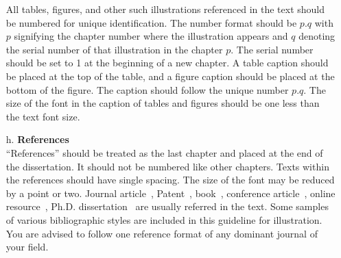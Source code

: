 \begin{itemize}
All tables, figures, and other such illustrations referenced in the text should be numbered for unique identification. The number format should be $p.q$ with $p$ signifying the chapter number where the illustration appears and $q$ denoting the serial number of that illustration in the chapter $p$. The serial number should be set to 1 at the beginning of a new chapter. A table caption should be placed at the top of the table, and a figure caption should be placed at the bottom of the figure. The caption should follow the unique number $p.q$. The size of the font in the caption of tables and figures should be one less than the text font size. 
\item [h.] \textbf{References}\\
``References'' should be treated as the last chapter and placed at the end of the dissertation. It should not be numbered like other chapters. Texts within the references should have single spacing. The size of the font may be reduced by a point or two. Journal article~\citep{Shannon,Lowe}, Patent~\citep{BulbE,ViBEpatent}, book~\citep{p00e,Vapnik}, conference article~\citep{Toyama,icra}, online resource~\citep{nasa,Kodak}, Ph.D. dissertation~\citep{Sutherland,Dhawan} are usually referred in the text. Some samples of various bibliographic styles are included in this guideline for illustration. You are advised to follow one reference format of any dominant journal of your field.
\end{itemize}

